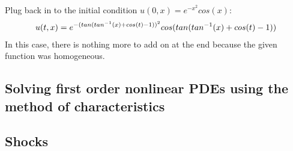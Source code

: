 \documentclass{article}
\newcommand{\bea}{\begin{eqnarray*}}
\newcommand{\eea}{\end{eqnarray*}}
\newcommand{\red}[1]{\textcolor{red}{#1}}
\newcommand{\blue}[1]{\textcolor{blue}{#1}}
\begin{document}
Plug back in to the initial condition $u(0,x) = e^{-x^2}cos(x)$:
\bea
u(t,x) = e^{-(tan(tan^{-1}(x) + cos(t) - 1))^2}cos(tan(tan^{-1}(x) + cos(t) - 1))\newline
\eea
In this case, there is nothing more to add on at the end because the given function was homogeneous.




\subsection{Solving first order nonlinear PDEs using the method of characteristics}



\subsection{Shocks}
\end{document}

